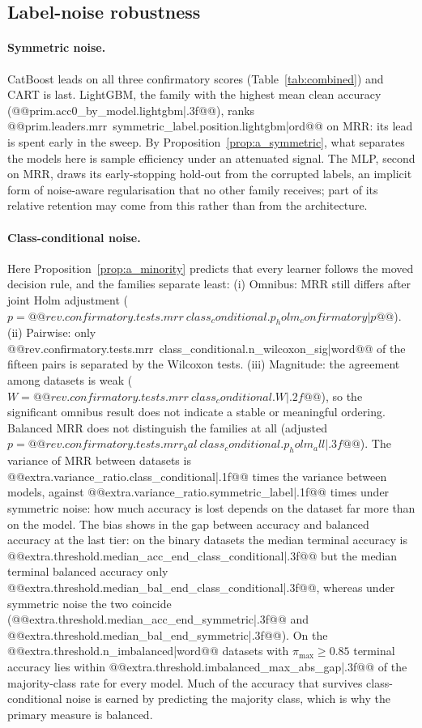 \documentclass[pdflatex,sn-mathphys]{sn-jnl}
\theoremstyle{thmstyleone}
\theoremstyle{thmstyletwo}
\theoremstyle{thmstylethree}
\begin{document}


\subsection{Label-noise robustness}\label{sec:res:label}

\paragraph{Symmetric noise.} CatBoost leads on all three confirmatory scores (Table~\ref{tab:combined}) and CART is last. LightGBM, the family with the highest mean clean accuracy (@@{prim.acc0_by_model.lightgbm|.3f}@@), ranks @@{prim.leaders.mrr~symmetric_label.position.lightgbm|ord}@@ on MRR: its lead is spent early in the sweep. By Proposition~\ref{prop:a_symmetric}, what separates the models here is sample efficiency under an attenuated signal. The MLP, second on MRR, draws its early-stopping hold-out from the corrupted labels, an implicit form of noise-aware regularisation that no other family receives; part of its relative retention may come from this rather than from the architecture.

\paragraph{Class-conditional noise.} Here Proposition~\ref{prop:a_minority} predicts that every learner follows the moved decision rule, and the families separate least: (i) Omnibus: MRR still differs after joint Holm adjustment ($p=@@{rev.confirmatory.tests.mrr~class_conditional.p_holm_confirmatory|p}@@$). (ii) Pairwise: only @@{rev.confirmatory.tests.mrr~class_conditional.n_wilcoxon_sig|word}@@ of the fifteen pairs is separated by the Wilcoxon tests. (iii) Magnitude: the agreement among datasets is weak ($W=@@{rev.confirmatory.tests.mrr~class_conditional.W|.2f}@@$), so the significant omnibus result does not indicate a stable or meaningful ordering. Balanced MRR does not distinguish the families at all (adjusted $p=@@{rev.confirmatory.tests.mrr_bal~class_conditional.p_holm_all|.3f}@@$). The variance of MRR between datasets is @@{extra.variance_ratio.class_conditional|.1f}@@ times the variance between models, against @@{extra.variance_ratio.symmetric_label|.1f}@@ times under symmetric noise: how much accuracy is lost depends on the dataset far more than on the model. The bias shows in the gap between accuracy and balanced accuracy at the last tier: on the binary datasets the median terminal accuracy is @@{extra.threshold.median_acc_end_class_conditional|.3f}@@ but the median terminal balanced accuracy only @@{extra.threshold.median_bal_end_class_conditional|.3f}@@, whereas under symmetric noise the two coincide (@@{extra.threshold.median_acc_end_symmetric|.3f}@@ and @@{extra.threshold.median_bal_end_symmetric|.3f}@@). On the @@{extra.threshold.n_imbalanced|word}@@ datasets with $\pi_{\max}\ge0.85$ terminal accuracy lies within @@{extra.threshold.imbalanced_max_abs_gap|.3f}@@ of the majority-class rate for every model. Much of the accuracy that survives class-conditional noise is earned by predicting the majority class, which is why the primary measure is balanced.
\end{document}
